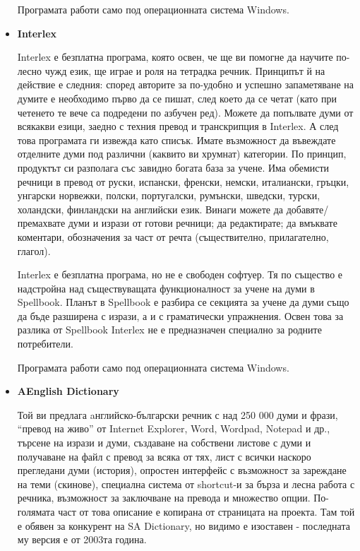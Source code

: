 \begin{itemize}
    Програмата работи само под операционната система Windows.

  \item \textbf{Interlex}

    Interlex е безплатна програма, която освен, че ще ви помогне да
    научите по-лесно чужд език, ще играе и роля на тетрадка
    речник. Принципът й на действие е следния: според авторите за
    по-удобно и успешно запаметяване на думите е необходимо първо да
    се пишат, след което да се четат (като при четенето те вече са
    подредени по азбучен ред). Можете да попълвате думи от всякакви
    езици, заедно с техния превод и транскрипция в Interlex. А след
    това програмата ги извежда като списък. Имате възможност да
    въвеждате отделните думи под различни (каквито ви хрумнат)
    категории. По принцип, продуктът си разполага със завидно богата
    база за учене. Има обемисти речници в превод от руски, испански,
    френски, немски, италиански, гръцки, унгарски норвежки, полски,
    португалски, румънски, шведски, турски, холандски, финландски на
    английски език. Винаги можете да добавяте/премахвате думи и изрази
    от готови речници; да редактирате; да вмъквате коментари,
    обозначения за част от речта (съществително, прилагателно,
    глагол).

    Interlex е безплатна програма, но не е свободен софтуер. Тя по
    същество е надстройна над съществуващата функционалност за учене
    на думи в Spellbook. Планът в Spellbook е разбира се секцията за
    учене да думи също да бъде разширена с изрази, а и с граматически
    упражнения. Освен това за разлика от Spellbook Interlex не е
    предназначен специално за родните потребители.

    Програмата работи само под операционната система Windows.

  \item \textbf{AEnglish Dictionary}

    Той ви предлага aнглийско-български речник с над 250 000 думи и
    фрази, "`превод на живо"' от Internet Explorer, Word, Wordpad, Notepad
    и др., търсене на изрази и думи, създаване на собствени листове с
    думи и получаване на файл с превод за всяка от тях, лист с всички
    наскоро прегледани думи (история), опростен интерфейс с възможност
    за зареждане на теми (скинове), специална система от shortcut-и за
    бърза и лесна работа с речника, възможност за заключване на
    превода и множество опции. По-голямата част от това описание е
    копирана от страницата на проекта. Там той е обявен за конкурент
    на SA Dictionary, но видимо е изоставен - последната му версия е
    от 2003та година.


\end{itemize}
